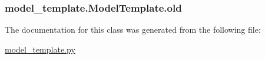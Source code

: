 \hypertarget{classmodel__template_1_1_model_template_acc16ac1b6b215e780256326d5bbe0355}{
\subsubsection[{old}]{\setlength{\rightskip}{0pt plus 5cm}model\-\_\-template.\-Model\-Template.\-old}}\label{classmodel__template_1_1_model_template_acc16ac1b6b215e780256326d5bbe0355}


The documentation for this class was generated from the following file\-:\begin{DoxyCompactItemize}
\item 
\hyperlink{model__template_8py}{model\-\_\-template.\-py}\end{DoxyCompactItemize}
